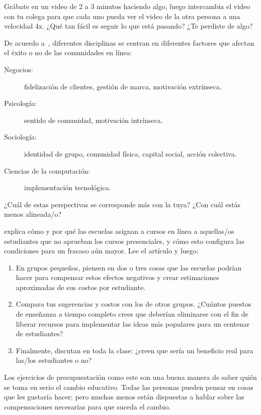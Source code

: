 

Grábate en un video de 2 a 3 minutos haciendo algo,
luego intercambia el video con tu colega
para que cada uno pueda ver el video de la otra persona a una velocidad 4x.
¿Qué tan fácil es seguir lo que está pasando?
¿Te perdiste de algo?


De acuerdo a~\cite{Irib2009},
diferentes disciplinas se centran en diferentes factores
que afectan el éxito o no de las comunidades en línea:

\begin{description}

\item[Negocios:]
  fidelización de clientes, gestión de marca, motivación extrínseca.

\item[Psicología:]
  sentido de comunidad, motivación intrínseca.

\item[Sociología:]
  identidad de grupo, comunidad física, capital social, acción colectiva.

\item[Ciencias de la computación:]
  implementación tecnológica.

\end{description}

¿Cuál de estas perspectivas se corresponde más con la tuya?
¿Con cuál estás menos alineada/o?


explica cómo y por qué las escuelas asignan a cursos en línea a aquellas/os estudiantes que no aprueban los cursos presenciales,
y cómo esto configura las condiciones para un fracaso aún mayor.
Lee el artículo y luego:

\begin{enumerate}

\item
  En grupos pequeños,
  piensen en dos o tres cosas que las escuelas podrían hacer para compensar estos efectos negativos
  y crear estimaciones aproximadas de sus costos por estudiante.

\item
  Compara tus sugerencias y costos con los de otros grupos.
  ¿Cuántos puestos de enseñanza a tiempo completo crees que deberían eliminarse
  con el fin de liberar recursos para implementar las ideas más populares para un centenar de estudiantes?

\item
  Finalmente, discutan en toda la clase:
  ¿creen que sería un beneficio real para las/los estudiantes o no?

\end{enumerate}

Los ejercicios de presupuestación como este son una buena manera de saber quién se toma en serio el cambio educativo.
Todas las personas pueden pensar en cosas que les gustaría hacer;
pero muchas menos están dispuestas a hablar sobre las compensaciones necesarias para que suceda el cambio.
